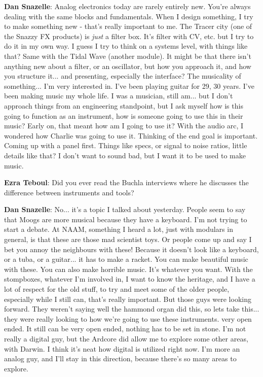 \textbf{Dan Snazelle}: Analog electronics today are rarely entirely new. You're always dealing with the same blocks and fundamentals. When I design something, I try to make something new - that's really important to me. The Tracer city (one of the Snazzy FX products) is \emph{just} a filter box. It's filter with CV, etc. but I try to do it in my own way. I guess I try to think on a systems level, with things like that? Same with the Tidal Wave (another module). It might be that there isn't anything new about a filter, or an oscillator, but how you approach it, and how you structure it... and presenting, especially the interface? The musicality of something... I'm very interested in. I've been playing guitar for 29, 30 years. I've been making music my whole life. I was a musician, still am... but I don't approach things from an engineering standpoint, but I ask myself how is this going to function as an instrument, how is someone going to use this in their music? Early on, that meant how am I going to use it? With the audio arc, I wondered how Charlie was going to use it. Thinking of the end goal is important. Coming up with a panel first. Things like specs, or signal to noise ratios, little details like that? I don't want to sound bad, but I want it to be used to make music. 

\textbf{Ezra Teboul}: Did you ever read the Buchla interviews where he discusses the difference between instruments and tools? 

\textbf{Dan Snazelle}: No... it's a topic I talked about yesterday. People seem to say that Moogs are more musical because they have a keyboard. I'm not trying to start a debate. At NAAM, something I heard a lot, just with modulars in general, is that these are those mad scientist toys. Or people come up and say I bet you annoy the neighbours with these! Because it doesn't look like a keyboard, or a tuba, or a guitar... it has to make a racket. You can make beautiful music with these. You can also make horrible music. It's whatever you want. With the stompboxes, whatever I'm involved in, I want to know the heritage, and I have a lot of respect for the old stuff, to try and meet some of the older people, especially while I still can, that's really important. But those guys were looking forward. They weren't saying well the hammond organ  did this, so lets take this... they were really looking to how we're going to use these instruments. very open ended. It still can be very open ended, nothing has to be set in stone. I'm not really a digital guy, but the Ardcore did allow me to explore some other areas, with Darwin. I think it's neat how digital is utilized right now. I'm more an analog guy, and I'll stay in this direction, because there's so many areas to explore. 

